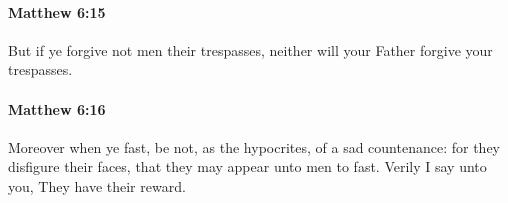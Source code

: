 		\paragraph{Matthew 6:15} %
			\label{MATTHEW-6-15}

			But if ye forgive not men their trespasses, neither will your Father forgive your trespasses.

			\begin{framed}
			\scriptsize
				\begin{compactdesc}
					\item[SBLG] 
				\end{compactdesc}
			\end{framed}

		\paragraph{Matthew 6:16} %
			\label{MATTHEW-6-16}

			Moreover when ye fast, be not, as the hypocrites, of a sad countenance: for they disfigure their faces, that they may appear unto men to fast. Verily I say unto you, They have their reward.

